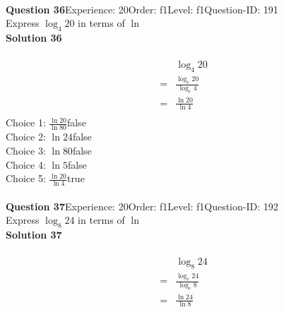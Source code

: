 \documentclass{article}
\begin{document}
\\[4pt]
\noindent\textbf{Question 36}\hspace{20pt}Experience: 20\hspace{20pt}Order: f1\hspace{20pt}Level: f1\hspace{20pt}Question-ID: 191\\[2pt]
Express $\log_{4}20$ in terms of $\ln$\\[4pt]
\noindent\textbf{Solution 36}\\[2pt]
\\[-35pt]\begin{align*}
&\log_{4}20\\[2pt]
=&\displaystyle\frac{\log_{e}20}{\log_{e}4}\\[2pt]
=&\displaystyle\frac{\ln20}{\ln4}\\[-100pt]
\end{align*}
Choice 1: \hspace{20pt}$\displaystyle\frac{\ln20}{\ln80}$\hspace{20pt}false\\
Choice 2: \hspace{20pt}$\ln{24}$\hspace{20pt}false\\
Choice 3: \hspace{20pt}$\ln{80}$\hspace{20pt}false\\
Choice 4: \hspace{20pt}$\ln{5}$\hspace{20pt}false\\
Choice 5: \hspace{20pt}$\displaystyle\frac{\ln20}{\ln4}$\hspace{20pt}true\\
\\[4pt]
\noindent\textbf{Question 37}\hspace{20pt}Experience: 20\hspace{20pt}Order: f1\hspace{20pt}Level: f1\hspace{20pt}Question-ID: 192\\[2pt]
Express $\log_{8}24$ in terms of $\ln$\\[4pt]
\noindent\textbf{Solution 37}\\[2pt]
\\[-35pt]\begin{align*}
&\log_{8}24\\[2pt]
=&\displaystyle\frac{\log_{e}24}{\log_{e}8}\\[2pt]
=&\displaystyle\frac{\ln24}{\ln8}\\[-100pt]
\end{align*}
\end{document}
